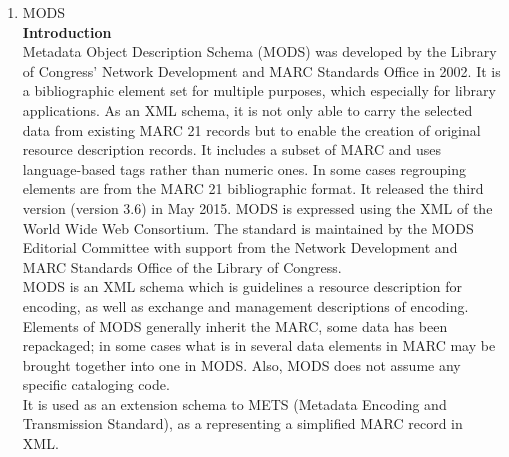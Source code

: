 \begin{enumerate}
	\item MODS\\
	{\bf Introduction}\\
	Metadata Object Description Schema (MODS) was developed by the Library of Congress' Network Development and MARC Standards Office in 2002. 
	It is a bibliographic element set for multiple purposes, which especially for library applications. 
	As an XML schema, it is not only able to carry the selected data from existing MARC 21 records but to enable the creation of original resource description records. 
	It includes a subset of MARC and uses language-based tags rather than numeric ones. In some cases regrouping elements are from the MARC 21 bibliographic format. 
	It released the third version (version 3.6) in May 2015. MODS is expressed using the XML of the World Wide Web Consortium. 
	The standard is maintained by the MODS Editorial Committee with support from the Network Development and MARC Standards Office of the Library of Congress.\\
	
	MODS is an XML schema which is guidelines a resource description for encoding, as well as exchange and management descriptions of encoding.\\
	
	Elements of MODS generally inherit the MARC, some data has been repackaged; in some cases what is in several data elements in MARC may be brought together into one in MODS. Also, MODS does not assume any specific cataloging code.\\ 
	It is used as an extension schema to METS (Metadata Encoding and Transmission Standard), as a representing a simplified MARC record in XML.
	

\end{enumerate}
